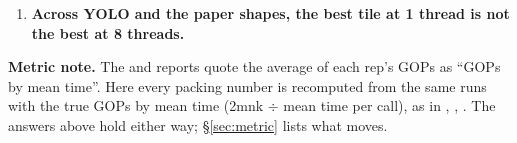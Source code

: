\begin{enumerate}
\begin{itemize}
  \item BERT and Square: within the 3\% board/day gap, except B3 at 1T (1.227), the shape where the vector packer is known to be slow ().
  \item Slowdown $\approx$ pack share $\times$ extra pack cost. n sets the pack share (87\% at n = 4, 7\% at n = 1024 at k = 256); k and m set the extra cost (1.2--3.4$\times$ when the packed blocks stay in cache, 1.02--1.12$\times$ when both packers wait on memory).
  \end{itemize}
\item \textbf{Across YOLO and the paper shapes, the best tile at 1 thread is not the best at 8 threads.}
\end{enumerate}

\noindent\textbf{Metric note.} The  and  reports quote the average of each rep's GOPs as ``GOPs by mean time''. Here every packing number is recomputed from the same runs with the true GOPs by mean time (2mnk $\div$ mean time per call), as in , , . The answers above hold either way; \S\ref{sec:metric} lists what moves.


